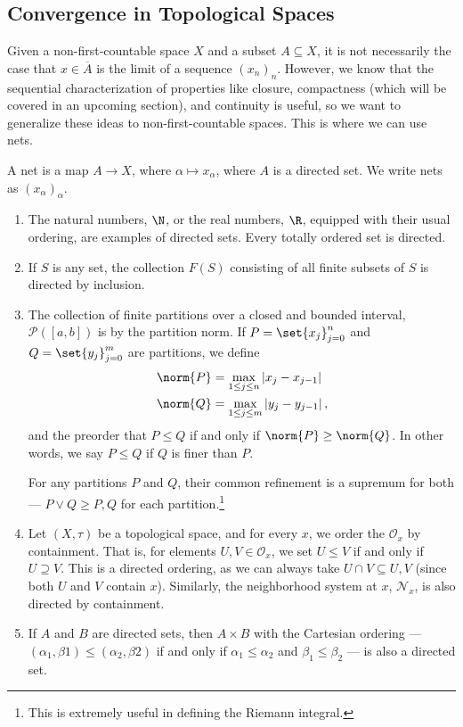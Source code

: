 \subsection{Convergence in Topological Spaces}%
Given a non-first-countable space $X$ and a subset $A\subseteq X$, it is not necessarily the case that $x\in \overline{A}$ is the limit of a sequence $\left(x_n\right)_n$. However, we know that the sequential characterization of properties like closure, compactness (which will be covered in an upcoming section), and continuity is useful, so we want to generalize these ideas to non-first-countable spaces. This is where we can use nets.
\begin{definition}[Nets]
  A net is a map $A\rightarrow X$, where $\alpha \mapsto x_{\alpha}$, where $A$ is a directed set. We write nets as $\left(x_{\alpha}\right)_{\alpha}$.
\end{definition}
\begin{example}\hfill
  \begin{enumerate}[(1)]
    \item The natural numbers, $\N$, or the real numbers, $\R$, equipped with their usual ordering, are examples of directed sets. Every totally ordered set is directed.
    \item If $S$ is any set, the collection $F(S)$ consisting of all finite subsets of $S$ is directed by inclusion.
    \item The collection of finite partitions over a closed and bounded interval, $\mathcal{P}\left(\left[a,b\right]\right)$ is by the partition norm. If $P = \set{x_j}_{j=0}^{n}$ and $Q=\set{y_j}_{j=0}^{m}$ are partitions, we define
      \begin{align*}
        \norm{P} &= \max_{1\leq j\leq n}\left\vert x_j-x_{j-1} \right\vert\\
        \norm{Q} &= \max_{1\leq j \leq m}\left\vert y_{j} - y_{j-1} \right\vert,
      \end{align*}
      and the preorder that $P \leq Q$ if and only if $\norm{P} \geq \norm{Q}$. In other words, we say $P\leq Q$ if $Q$ is finer than $P$.\newline

      For any partitions $P$ and $Q$, their common refinement is a supremum for both --- $P\vee Q \geq P,Q$ for each partition.\footnote{This is extremely useful in defining the Riemann integral.}
    \item Let $\left(X,\tau\right)$ be a topological space, and for every $x$, we order the $\mathcal{O}_{x}$ by containment. That is, for elements $U,V\in \mathcal{O}_{x}$, we set $U\leq V$ if and only if $U\supseteq V$. This is a directed ordering, as we can always take $U\cap V \subseteq U,V$ (since both $U$ and $V$ contain $x$). Similarly, the neighborhood system at $x$, $\mathcal{N}_x$, is also directed by containment.
    \item If $A$ and $B$ are directed sets, then $A\times B$ with the Cartesian ordering --- $\left(\alpha_1,\beta 1\right) \leq \left(\alpha_2,\beta 2\right)$ if and only if $\alpha_1\leq \alpha_2$ and $\beta_1 \leq \beta_2$ --- is also a directed set.
  \end{enumerate}
\end{example}
